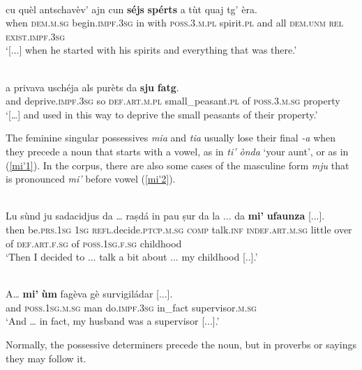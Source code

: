 \\
\gll [...] cu quèl antschavèv’ ajn cun \textbf{séjs} \textbf{spérts} a tùt quaj tg’ èra.\\
{} when \textsc{dem.m.sg} begin.\textsc{impf.3sg} in with \textsc{poss.3.m.pl} spirit.\textsc{pl}  and all \textsc{dem.unm} \textsc{rel} \textsc{exist.impf.3sg}  \\
\glt `[...] when he started with his spirits and everything that was there.'
\z

\ea

\\
\gll   […] a privava uschéja als purèts da \textbf{sju} \textbf{fatg}.\\
     {} and deprive.\textsc{impf.3sg} so \textsc{def.art.m.pl} small\_peasant.\textsc{pl} of \textsc{poss.3.m.sg} property\\
\glt `[…] and used in this way to deprive the small peasants of their property.'
\z

The feminine singular possessives \textit{mia} and \textit{tia} usually lose their final \textit{-a} when they precede a noun that starts with a vowel, as in \textit{ti' ònda} `your aunt', or as in (\ref{mi'1}). In the corpus, there are also some cases of the masculine form \textit{mju} that is pronounced \textit{mi'} before vowel (\ref{mi'2}).

\ea
\label{mi'1}
\\
\gll Lu sùnd ju sadacidjus da … raṣdá in pau ṣur da la ... da \textbf{mi’} \textbf{ufaunza} [...]. \\
then  be.\textsc{prs.1sg} \textsc{1sg}  \textsc{refl}.decide.\textsc{ptcp.m.sg} \textsc{comp} {} talk.\textsc{inf} \textsc{indef.art.m.sg} little over of  \textsc{def.art.f.sg} {} of  \textsc{poss.1sg.f.sg} childhood\\
\glt `Then I decided to ... talk a bit about ... my childhood [..].'
\z

\ea
\label{mi'2}
\\
\gll  A… \textbf{mi'} \textbf{ùm} fagèva gè survigiládar [...].  \\
and \textsc{poss.1sg.m.sg} man do.\textsc{impf.3sg} in\_fact supervisor.\textsc{m.sg}\\
\glt `And … in fact, my husband was a supervisor [...].'
\z

Normally, the possessive determiners precede the noun, but in proverbs or sayings they may follow it.

